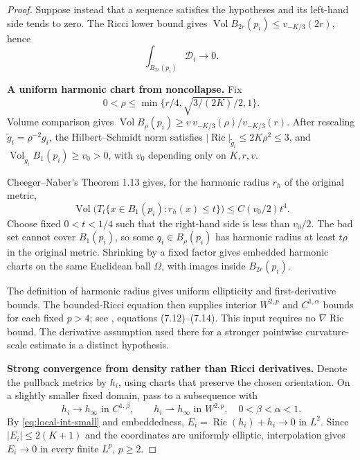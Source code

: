 \documentclass[a4paper,11pt]{article}
\theoremstyle{paper}
\DeclareMathOperator{\Ric}{Ric}
\DeclareMathOperator{\Vol}{Vol}
\newcommand{\Dcal}{\mathcal D}
\numberwithin{equation}{section}
\begin{document}
\begin{proof}
Suppose instead that a sequence satisfies the hypotheses and its left-hand side tends to zero. The Ricci lower bound gives $\Vol B_{2r}(p_i)\le v_{-K/3}(2r)$, hence
\begin{equation}\label{eq:local-int-small}
\int_{B_{2r}(p_i)}\Dcal_i\longrightarrow0.
\end{equation}

\textbf{A uniform harmonic chart from noncollapse.}
Fix
\[
0<\rho\le\min\{r/4,\sqrt{3/(2K)}/2,1\}.
\]
Volume comparison gives $\Vol B_\rho(p_i)\ge v\,v_{-K/3}(\rho)/v_{-K/3}(r)$. After rescaling $\tilde g_i=\rho^{-2}g_i$, the Hilbert--Schmidt norm satisfies $|\Ric|_{\tilde g_i}\le2K\rho^2\le3$, and $\Vol_{\tilde g_i}B_1(p_i)\ge v_0>0$, with $v_0$ depending only on $K,r,v$.

Cheeger--Naber's Theorem 1.13 \cite{cn} gives, for the harmonic radius $r_h$ of the original metric,
\begin{equation}\label{eq:CN}
\Vol\bigl(T_t\{x\in B_1(p_i):r_h(x)\le t\}\bigr)\le C(v_0/2)t^4.
\end{equation}
Choose fixed $0<t<1/4$ such that the right-hand side is less than $v_0/2$. The bad set cannot cover $B_1(p_i)$, so some $q_i\in B_\rho(p_i)$ has harmonic radius at least $t\rho$ in the original metric. Shrinking by a fixed factor gives embedded harmonic charts on the same Euclidean ball $\Omega$, with images inside $B_{2r}(p_i)$.

The definition of harmonic radius gives uniform ellipticity and first-derivative bounds. The bounded-Ricci equation then supplies interior $W^{2,p}$ and $C^{1,\alpha}$ bounds for each fixed $p>4$; see \cite{cn}, equations (7.12)--(7.14). This input requires no $\nabla\Ric$ bound. The derivative assumption used there for a stronger pointwise curvature-scale estimate is a distinct hypothesis.

\textbf{Strong convergence from density rather than Ricci derivatives.}
Denote the pullback metrics by $h_i$, using charts that preserve the chosen orientation. On a slightly smaller fixed domain, pass to a subsequence with
\[
h_i\to h_\infty\text{ in }C^{1,\beta},\qquad
h_i\rightharpoonup h_\infty\text{ in }W^{2,p},\quad0<\beta<\alpha<1.
\]
By \eqref{eq:local-int-small} and embeddedness, $E_i=\Ric(h_i)+h_i\to0$ in $L^2$. Since $|E_i|\le2(K+1)$ and the coordinates are uniformly elliptic, interpolation gives $E_i\to0$ in every finite $L^p$, $p\ge2$.


\end{proof}
\end{document}
